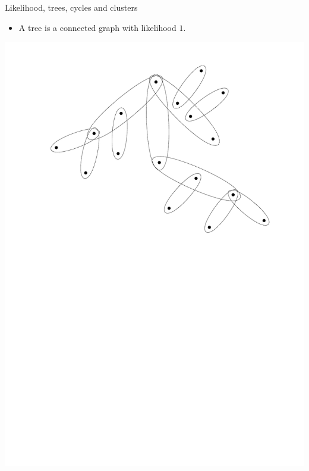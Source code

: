 \documentclass[handout, 11pt]{beamer}
\begin{document}
	\begin{frame}{Likelihood, trees, cycles and clusters} 
	\begin{itemize}
		\item A tree is a connected graph with likelihood $1$.
		\vspace*{0.5 em}
	\end{itemize}
	
	\begin{center}
		\includegraphics[width=0.7\linewidth]{Tree.pdf}
	\end{center}
	\end{frame}
	
\end{document}
